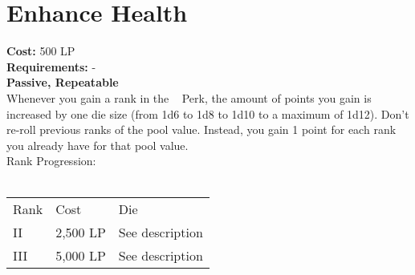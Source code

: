 \section{Enhance Health}\label{sec:enhanceHealth}
\textbf{Cost:} 500 LP\\
\textbf{Requirements:} -\\
\textbf{Passive, Repeatable}\\
Whenever you gain a rank in the ~ Perk, the amount of points you gain is increased by one die size (from 1d6 to 1d8 to 1d10 to a maximum of 1d12).
Don't re-roll previous ranks of the pool value.
Instead, you gain 1 point for each rank you already have for that pool value.
\\
Rank Progression:\\
\\
\begin{tabular}{l | l | p{12cm} }
    Rank & Cost & Die\\
    II & 2,500 LP & See description \\
    III & 5,000 LP & See description \\
\end{tabular}